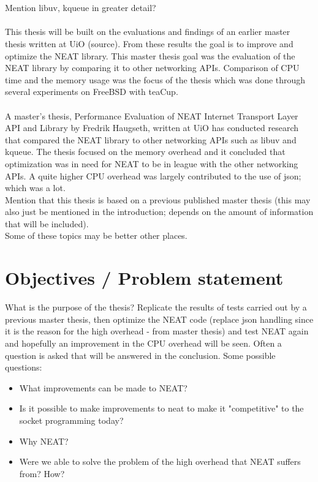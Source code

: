 \documentclass[12pt]{report}
\begin{document}
\\ \\
Mention libuv, kqueue in greater detail? \\ \\
This thesis will be built on the evaluations and findings of an earlier master thesis written at UiO (source). From these results the goal is to improve and optimize the NEAT library. This master thesis goal was the evaluation of the NEAT library by comparing it to other networking APIs. Comparison of CPU time and the memory usage was the focus of the thesis which was done through several experiments on FreeBSD with teaCup. \\
\\
A master's thesis, Performance Evaluation of NEAT Internet Transport Layer API and Library by Fredrik Haugseth, written at UiO has conducted research that compared the NEAT library to other networking APIs such as libuv and kqueue. The thesis focused on the memory overhead and it concluded that optimization was in need for NEAT to be in league with the other networking APIs. A quite higher CPU overhead was largely contributed to the use of json; which was a lot. 
\\
Mention that this thesis is based on a previous published master thesis (this may also just be mentioned in the introduction; depends on the amount of information that will be included). \\
Some of these topics may be better other places.


\section{Objectives / Problem statement}
What is the purpose of the thesis? Replicate the results of tests carried out by a previous master thesis, then optimize the NEAT code (replace json handling since it is the reason for the high overhead - from master thesis) and test NEAT again and hopefully an improvement in the CPU overhead will be seen. Often a question is asked that will be answered in the conclusion. Some possible questions: 
\begin{itemize}
\item What improvements can be made to NEAT?
\item Is it possible to make improvements to neat to make it "competitive" to the socket programming today?
\item Why NEAT?
\item Were we able to solve the problem of the high overhead that NEAT suffers from? How?
\end{itemize}
\end{document}
